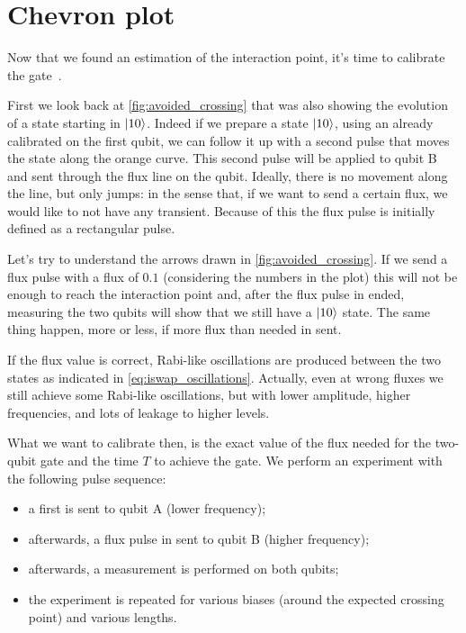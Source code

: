
\section{Chevron plot}

Now that we found an estimation of the interaction point, it's time to calibrate the gate~\cite{Gu2021}.

First we look back at \cref{fig:avoided_crossing} that was also showing the evolution of a state starting in $\ket{10}$.
Indeed if we prepare a state $\ket{10}$, using an already calibrated \pipulse on the first qubit, we can follow it up with a second pulse that moves the state along the orange curve.
This second pulse will be applied to qubit B and sent through the flux line on the qubit.
Ideally, there is no movement along the line, but only jumps: in the sense that, if we want to send a certain flux, we would like to not have any transient.
Because of this the flux pulse is initially defined as a rectangular pulse.

Let's try to understand the arrows drawn in \cref{fig:avoided_crossing}.
If we send a flux pulse with a flux of $0.1$ (considering the numbers in the plot) this will not be enough to reach the interaction point and, after the flux pulse in ended, measuring the two qubits will show that we still have a $\ket{10}$ state.
The same thing happen, more or less, if more flux than needed in sent.

If the flux value is correct, Rabi-like oscillations are produced between the two states as indicated in \cref{eq:iswap_oscillations}.
Actually, even at wrong fluxes we still achieve some Rabi-like oscillations, but with lower amplitude, higher frequencies, and lots of leakage to higher levels.

What we want to calibrate then, is the exact value of the flux needed for the two-qubit gate and the time $T$ to achieve the gate.
We perform an experiment with the following pulse sequence:
\begin{itemize}
    \item a first \pipulse is sent to qubit A (lower frequency);
    \item afterwards, a flux pulse in sent to qubit B (higher frequency);
    \item afterwards, a measurement is performed on both qubits;
    \item the experiment is repeated for various biases (around the expected crossing point) and various lengths.
\end{itemize}


